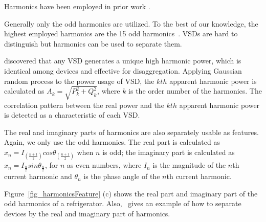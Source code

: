 Harmonics have been employed in prior work 
\cite{laughman2003power,lee2005estimation,srinivasan2006neural,akbar2007modified,matthews2008auto,wichakool2009modeling}.
\iffalse
\huijuanc{will be deleted until huijuan's next comments.}
Some paper mentioned $N_{highest}$ as 11
because that's the highest useful harmonic for disaggregation.
\manishc{why?}.
Other papers~\cite{srinivasan2006neural} set $N$ to be 16 in order to capture more harmonics information
\manishc{but the previous senstence says that 11 is the highest useful harmonic}.
\huijuanc{change above sentences as follows.}
\fi
Generally only the odd harmonics are utilized. 
To the best of our knowledge, the highest employed harmonics are 
the 15 odd harmonics~\cite{srinivasan2006neural}. 
VSDs are hard to distinguish
but harmonics can be used to separate them. 
\iffalse
\huijuanc{delete until next comments of huijuan}
\cite{lee2003PhdThesis,lee2005estimation} thoroughly explained the approaches
as estimating the mean of higher harmonics of apparent power, 
then correlating the apparent power with the fundamental harmonic powers, 
thus identifying the VSDs \manishc{it is hard to understand this sentence,
  what is fundamental powers?  please re-word}
  \huijuanc{paraphrases as follows.}
 \fi
  \cite{lee2003PhdThesis,lee2005estimation} discovered that any VSD generates 
  a unique high harmonic power, which is identical among devices and effective for disaggregation. 
  Applying Gaussian random process to the power usage of VSD, 
  the $kth$ apparent harmonic power
  is calculated as $A_k=\sqrt{P_k^2+Q_k^2}$, where $k$ is the order number of 
the harmonics. 
The correlation pattern between the real power and 
the $kth$ apparent harmonic power is detected as a characteristic of each VSD. 

The real and imaginary parts of harmonics are also separately usable as features. 
Again, we only use the odd harmonics. 
The real part is calculated as 
$x_n=I_{(\frac{n+1}{2})}cos\theta_{(\frac{n+1}{2})}$ when $n$ is odd; 
the imaginary part is calculated as 
$x_n=I_{\frac{n}{2}}sin\theta_{\frac{n}{2}}$, 
for $n$ as even numbers, 
where $I_n$ is the magnitude of the $n$th current harmonic and
$\theta_n$ is the phase angle of the $n$th current harmonic. 
\iffalse
\manishc{are these equations only for odd harmonics? i vaguely remember that
  only odd harmonics are interesting. could you verify that, and find out why
  it is so, and include it here.}
  \huijuanc{Yes. That's the reason the paper of Srinivasan only mentioned the odd number of harmonics here.}
\fi
Figure~\ref{fig_harmonicsFeature} (c) shows the real part and imaginary part 
of the odd harmonics of a refrigerator. 
Also,~\cite{srinivasan2006neural} gives an example of how to separate devices 
by the real and imaginary part of harmonics. 

